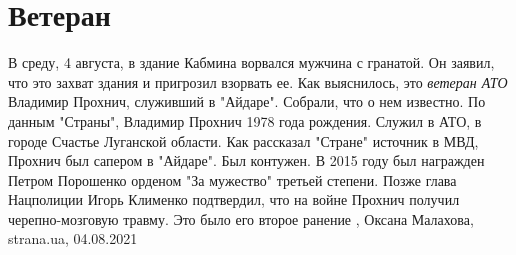  
 
 
 
 
\chapter{Ветеран}

В среду, 4 августа, в здание Кабмина ворвался мужчина с гранатой. Он заявил,
что это захват здания и пригрозил взорвать ее. Как выяснилось, это \emph{ветеран АТО}
Владимир Прохнич, служивший в "Айдаре".  Собрали, что о нем известно.  По
данным "Страны", Владимир Прохнич 1978 года рождения. Служил в АТО, в городе
Счастье Луганской области.  Как рассказал "Стране" источник в МВД, Прохнич был сапером в "Айдаре". Был
контужен. В 2015 году был награжден Петром Порошенко орденом "За мужество"
третьей степени.  Позже глава Нацполиции Игорь Клименко подтвердил, что на
войне Прохнич получил черепно-мозговую травму. Это было его второе ранение
, 
Оксана Малахова, strana.ua, 04.08.2021
